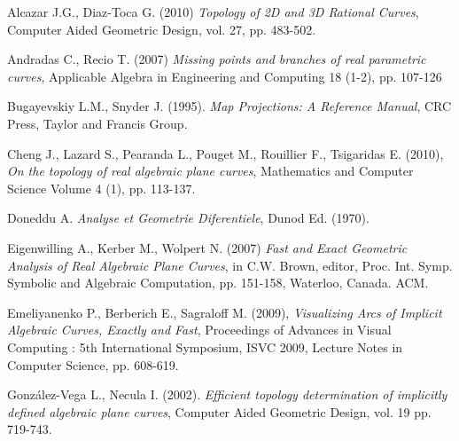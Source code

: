 \documentclass{elsart}
\begin{document}
\begin{thebibliography}{56}













 Alcazar J.G., Diaz-Toca G. (2010) {\it Topology of 2D and 3D Rational Curves}, Computer Aided Geometric Design, vol. 27, pp.
483-502.



 Andradas C., Recio T. (2007) {\it Missing points and branches of real parametric curves}, Applicable Algebra in
Engineering and Computing 18 (1-2), pp. 107-126





 Bugayevskiy L.M., Snyder J. (1995). {\it Map Projections: A Reference Manual}, CRC Press, Taylor and Francis Group.





 Cheng J., Lazard S., Pearanda L., Pouget M., Rouillier F., Tsigaridas E. (2010), {\it On the topology of real algebraic plane curves}, Mathematics and Computer Science Volume 4 (1), pp. 113-137.



 Doneddu A. {\it Analyse et Geometrie Diferentiele}, Dunod Ed. (1970).



 Eigenwilling A., Kerber M., Wolpert N. (2007) {\it Fast and Exact Geometric Analysis of Real Algebraic Plane Curves}, in C.W. Brown, editor, Proc. Int. Symp. Symbolic and Algebraic Computation, pp. 151-158, Waterloo, Canada. ACM.

     Emeliyanenko P., Berberich E., Sagraloff M. (2009), {\it Visualizing Arcs of Implicit Algebraic Curves, Exactly and Fast}, Proceedings of
Advances in Visual Computing : 5th International Symposium, ISVC 2009, Lecture Notes in Computer Science, pp. 608-619.










 Gonz\'alez-Vega L., Necula I. (2002).
{\it Efficient topology determination of implicitly defined
algebraic plane curves}, Computer Aided Geometric Design, vol. 19
pp. 719-743.


\end{thebibliography}
\end{document}
